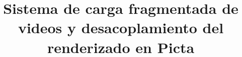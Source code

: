 \documentclass[spanish]{thesis}
\title{Sistema de carga fragmentada de videos y desacoplamiento del renderizado en Picta}
\begin{document}
  \SetWatermarkText{}
  \maketitle
  
  
  
  
  
  
  
\end{document}
